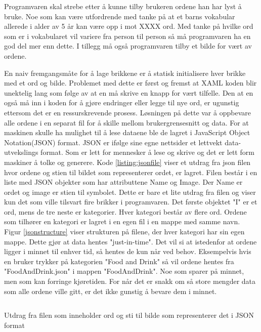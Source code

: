 {Programvaren skal strebe etter å kunne tilby brukeren ordene han har lyst å bruke. Noe som kan være utfordrende med tanke på at et barns vokabular allerede i alder av 5 år kan være opp i mot XXXX ord. Med tanke på hvilke ord som er i vokabularet vil variere  fra person til person så må programvaren ha en god del mer enn dette. I tillegg må også programvaren tilby et bilde for vært av ordene. 

En naiv fremgangsmåte for å lage brikkene er å statisk initialisere hver brikke med et ord og bilde. Problemet med dette er først og fremst at XAML koden blir unektelig lang som følge av at en må skrive en knapp for vært tilfelle. Den at en også må inn i koden for å gjøre endringer eller legge til nye ord, er ugunstig ettersom det er en ressurskrevende prosess. Løsningen på dette var å oppbevare alle ordene i en separat fil for å skille mellom brukergrensesnitt og data. For at maskinen skulle ha mulighet til å lese dataene ble de lagret i JavaScript Object Notation(JSON) format. JSON er ifølge sine egne nettsider \cite{JSON7:online} et lettvekt data-utvekslings format. Som er lett for mennesker å lese og skrive og det er lett form maskiner å tolke og generere. Kode \ref{listing:jsonfile} viser et utdrag fra json filen hvor ordene og stien til bildet som representerer ordet, er lagret. Filen består i en liste med JSON objekter som har attributtene Name og Image. Der Name er ordet og image er stien til symbolet. Dette er bare et lite utdrag fra filen og viser kun det som ville tilsvart fire brikker i programvaren. Det første objektet "I" er et ord, mens de tre neste er kategorier. Hver kategori består av flere ord. Ordene som tilhører en kategori er lagret i en egen fil i en mappe med samme navn. Figur \ref{jsonstructure} viser strukturen på filene, der hver kategori har sin egen mappe. Dette gjør at data hentes "just-in-time". Det vil si at istedenfor at ordene ligger i minnet til enhver tid, så hentes de kun når ved behov. Eksempelvis hvis en bruker trykker på kategorien "Food and Drink" så vil ordene hentes fra "FoodAndDrink.json" i mappen "FoodAndDrink". Noe som sparer på minnet, men som kan forringe kjøretiden. For når det er snakk om så store mengder data som alle ordene ville gitt, er det ikke gunstig å bevare dem i minnet. 


\begin{listing}[ht] 
\inputminted[fontsize=\footnotesize, frame=lines,framesep=2mm,baselinestretch=1.2,bgcolor=lightgray,linenos]{json}{Code/JSONfile.json} 
\caption{Utdrag fra filen som inneholder ord og sti til bilde som representerer det i JSON format} 
\label{listing:jsonfile} 
\end{listing} 
 
}
